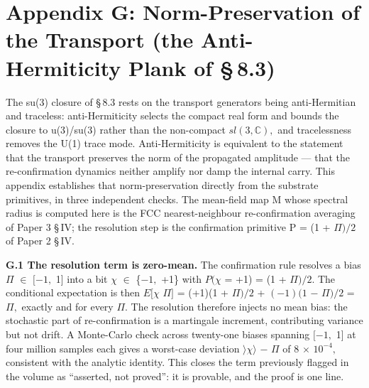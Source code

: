 \documentclass[11pt,oneside]{report}
\theoremstyle{definition}
\theoremstyle{remark}
\begin{document}
\section*{Appendix G: Norm-Preservation of the Transport (the Anti-Hermiticity Plank of \S\,8.3)}

The su(3) closure of \S\,8.3 rests on the transport generators being
anti-Hermitian and traceless: anti-Hermiticity selects the compact real
form and bounds the closure to u(3)/su(3) rather than the non-compact
\ensuremath{sl(3,\mathbb{C}),} and tracelessness removes the U(1) trace mode. Anti-Hermiticity
is equivalent to the statement that the transport preserves the norm of
the propagated amplitude --- that the re-confirmation dynamics neither
amplify nor damp the internal carry. This appendix establishes that
norm-preservation directly from the substrate primitives, in three
independent checks. The mean-field map M whose spectral radius is
computed here is the FCC nearest-neighbour re-confirmation averaging of
Paper 3 \S\,IV; the resolution step is the confirmation primitive P = (1 +
\ensuremath{\Pi )/2} of Paper 2 \S\,IV.

\textbf{G.1 The resolution term is zero-mean.} The confirmation rule
resolves a bias \ensuremath{\Pi} \ensuremath{\in} \ensuremath{[-1,} 1] into a bit \ensuremath{\chi} \ensuremath{\in} \{\ensuremath{-1,} +1\} with \ensuremath{P(\chi} = +1)
= (1 + \ensuremath{\Pi )/2.} The conditional expectation is then \ensuremath{E[\chi} \textbar{} \ensuremath{\Pi ]} =
(+1)(1 + \ensuremath{\Pi )/2} + \ensuremath{(-1)(1} \ensuremath{-} \ensuremath{\Pi )/2} = \ensuremath{\Pi ,} exactly and for every \ensuremath{\Pi .} The
resolution therefore injects no mean bias: the stochastic part of
re-confirmation is a martingale increment, contributing variance but not
drift. A Monte-Carlo check across twenty-one biases spanning \ensuremath{[-1,} 1]
at four million samples each gives a worst-case deviation \textbar\ensuremath{〉\chi 〉}
\ensuremath{-} \ensuremath{\Pi}\textbar{} of 8 \ensuremath{\times} \ensuremath{10^{-4},} consistent with the analytic identity. This
closes the term previously flagged in the volume as ``asserted, not
proved'': it is provable, and the proof is one line.
\end{document}

